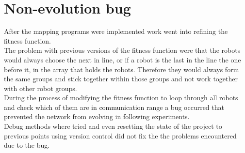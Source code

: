 \section{Non-evolution bug}
After the mapping programs were implemented work went into refining the fitness function. \\
The problem with previous versions of the fitness function were that the robots would always choose the next in line, or if a robot is the last in the line the one before it, in the array that holds the robots. Therefore they would always form the  same groups and stick together within those groups and not work together with other robot groups.\\
During the process of modifying the fitness function to loop through all robots and check which of them are in communication range a bug occurred that prevented the network from evolving in following experiments. \\
Debug methods where tried and even resetting the state of the project to previous points using version control did not fix the the problems encountered due to the bug. \\

